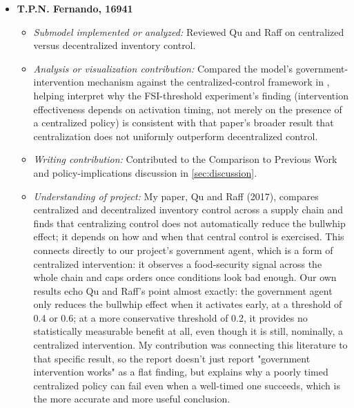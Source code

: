 \documentclass[final,onefignum,onetabnum]{siuro250211}
\begin{document}
\begin{itemize}[leftmargin=.3in]
\item[] \textbf{T.P.N. Fernando, 16941}
\begin{itemize}
\item \textit{Submodel implemented or analyzed:} Reviewed Qu and Raff \cite{QuRaff2017} on
centralized versus decentralized inventory control.
\item \textit{Analysis or visualization contribution:} Compared the model's government-intervention
mechanism against the centralized-control framework in \cite{QuRaff2017}, helping interpret why
the FSI-threshold experiment's finding (intervention effectiveness depends on activation timing,
not merely on the presence of a centralized policy) is consistent with that paper's broader result
that centralization does not uniformly outperform decentralized control.
\item \textit{Writing contribution:} Contributed to the Comparison to Previous Work and
policy-implications discussion in \cref{sec:discussion}.
\item \textit{Understanding of project:} My paper, Qu and Raff (2017), compares centralized and
decentralized inventory control across a supply chain and finds that centralizing control does not
automatically reduce the bullwhip effect; it depends on how and when that central control is
exercised. This connects directly to our project's government agent, which is a form of
centralized intervention: it observes a food-security signal across the whole chain and caps
orders once conditions look bad enough. Our own results echo Qu and Raff's point almost exactly:
the government agent only reduces the bullwhip effect when it activates early, at a threshold of
0.4 or 0.6; at a more conservative threshold of 0.2, it provides no statistically measurable
benefit at all, even though it is still, nominally, a centralized intervention. My contribution was
connecting this literature to that specific result, so the report doesn't just report "government
intervention works" as a flat finding, but explains why a poorly timed centralized policy can fail
even when a well-timed one succeeds, which is the more accurate and more useful conclusion.
\end{itemize}


\end{itemize}
\end{document}
